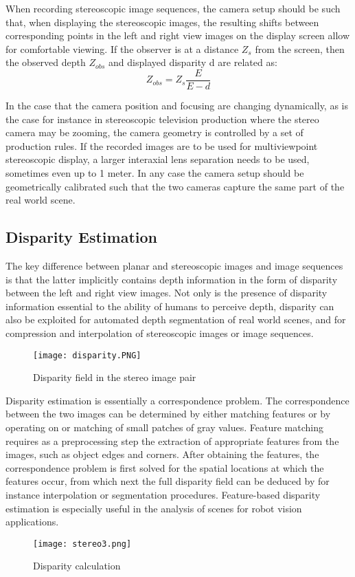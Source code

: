 		When  recording  stereoscopic  image  sequences,  the  camera  setup  should  be  such  that,  when displaying the stereoscopic images, the resulting shifts between corresponding points in the left and right view images on the display screen allow for comfortable viewing. If the observer is at a distance $Z_s$ from the screen, then the observed depth $Z_{obs}$ and displayed disparity d are related as:
		\begin{equation}
		Z_{obs} = Z_s \frac{E}{E-d}
		\end{equation}
		
		In  the  case  that  the  camera  position  and  focusing  are  changing dynamically,  as  is  the  case  for  instance in stereoscopic television production where the stereo camera may be zooming, the camera geometry is controlled by a set of production rules. If the recorded images are to be used  for  multiviewpoint  stereoscopic  display,  a  larger  interaxial  lens  separation  needs  to  be used,  sometimes  even  up  to  1  meter.  In  any  case  the  camera  setup  should  be  geometrically calibrated  such  that  the  two  cameras  capture  the  same  part  of  the  real  world  scene. 
	
	\newpage
	\subsection{Disparity Estimation}
		The  key  difference  between  planar  and  stereoscopic  images  and  image  sequences  is  that  the latter  implicitly  contains  depth  information  in  the  form  of  disparity  between  the  left  and  right view images. Not only is the presence of disparity information essential to the ability of humans to  perceive  depth,  disparity  can  also  be  exploited  for  automated  depth  segmentation  of  real world   scenes,   and   for   compression   and   interpolation   of   stereoscopic   images   or   image sequences.
		\begin{figure}[htbp]
			\centering
			\texttt{[image: disparity.PNG]}
			\caption{Disparity field in the stereo image pair \label{Disparity field in the stereo image pair }}
		\end{figure}
		
		Disparity estimation is essentially a correspondence problem. The correspondence between the two  images  can  be  determined  by  either  matching  features  or  by  operating  on  or  matching  of small patches of gray values. Feature matching requires as a preprocessing step the extraction of appropriate features from the images, such as object edges and corners. After obtaining the features,  the  correspondence  problem  is  first  solved  for  the  spatial  locations  at  which  the features  occur,  from  which  next  the  full  disparity field  can  be  deduced  by  for  instance interpolation  or  segmentation  procedures.  Feature-based  disparity  estimation  is  especially 
		useful in the analysis of scenes for robot vision applications.
		\begin{figure}[htbp]
			\centering
			\texttt{[image: stereo3.png]}
			\caption{Disparity calculation \label{Disparity calculation }}
		\end{figure}
		
